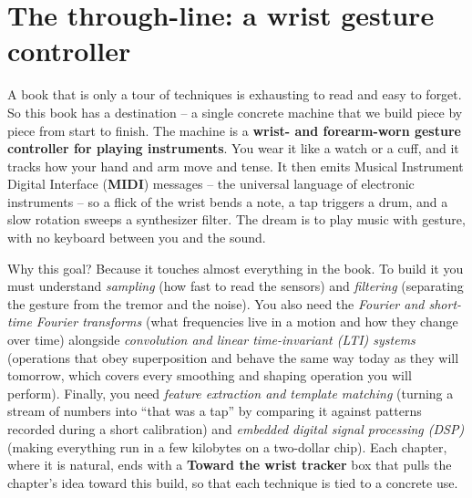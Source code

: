 \section*{The through-line: a wrist gesture controller}

A book that is only a tour of techniques is exhausting to read and easy to forget. So this
book has a destination -- a single concrete machine that we build piece by piece from start
to finish. The machine is a \textbf{wrist- and forearm-worn gesture controller for playing
instruments}. You wear it like a watch or a cuff, and it tracks how your hand and arm move and
tense. It then emits Musical Instrument Digital Interface (\textbf{MIDI}) messages -- the universal language of electronic instruments -- so
a flick of the wrist bends a note, a tap triggers a drum, and a slow rotation sweeps a
synthesizer filter. The dream is to play music with gesture, with no keyboard between
you and the sound.

Why this goal? Because it touches almost everything in the book. To build it you must
understand \emph{sampling} (how fast to read the sensors) and \emph{filtering} (separating the
gesture from the tremor and the noise). You also need the \emph{Fourier and short-time Fourier transforms}
(what frequencies live in a motion and how they change over time) alongside \emph{convolution and
linear time-invariant (LTI) systems} (operations that obey superposition and behave the same way today as they will tomorrow, which covers every smoothing and shaping operation you will perform).
Finally, you need \emph{feature extraction and template matching} (turning a stream of numbers into
``that was a tap'' by comparing it against patterns recorded during a short
calibration) and \emph{embedded digital signal processing (DSP)} (making everything run in a few kilobytes on a
two-dollar chip). Each chapter, where it is natural,
ends with a \textbf{Toward the wrist tracker} box that pulls the chapter's idea toward this
build, so that each technique is tied to a concrete use.

